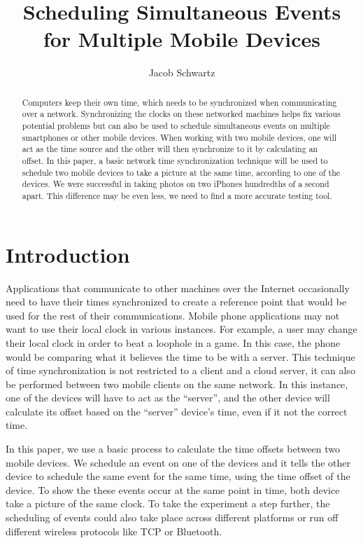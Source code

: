 \documentclass[10pt]{IEEEtran}
\begin{document}
\title{Scheduling Simultaneous Events for Multiple Mobile Devices}
\author{Jacob Schwartz}
\maketitle

\begin{abstract}
Computers keep their own time, which needs to be synchronized when communicating
over a network. Synchronizing the clocks on these networked machines helps fix
various potential problems but can also be used to schedule simultaneous events
on multiple smartphones or other mobile devices.  When working with two mobile
devices, one will act as the time source and the other will then synchronize to
it by calculating an offset. In this paper, a basic network time synchronization
technique will be used to schedule two mobile devices to take a picture at the
same time, according to one of the devices. We were successful in taking photos
on two iPhones hundredths of a second apart. This difference may be even less,
we need to find a more accurate testing tool.
\end{abstract}

\section{Introduction}

Applications that communicate to other machines over the Internet occasionally
need to have their times synchronized to create a reference point that would be
used for the rest of their communications.  Mobile phone applications may not
want to use their local clock in various instances. For example, a user may
change their local clock in order to beat a loophole in a game. In this case,
the phone would be comparing what it believes the time to be with a server. This
technique of time synchronization is not restricted to a client and a cloud
server, it can also be performed between two mobile clients on the same network.
In this instance, one of the devices will have to act as the ``server'', and the
other device will calculate its offset based on the ``server'' device's time,
even if it not the correct time.

In this paper, we use a basic process to calculate the time offsets between two
mobile devices. We schedule an event on one of the devices and it tells the
other device to schedule the same event for the same time, using the time offset
of the device. To show the these events occur at the same point in time, both
device take a picture of the same clock. To take the experiment a step further,
the scheduling of events could also take place across different platforms or run
off different wireless protocols like TCP or Bluetooth.
\end{document}
